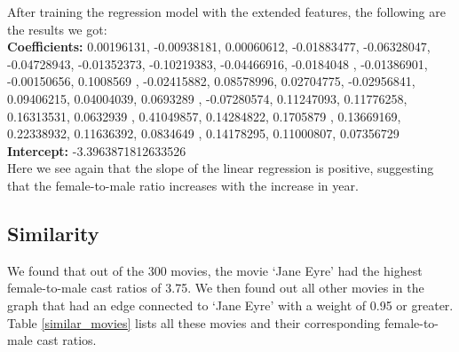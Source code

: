 \documentclass[12pt]{article}
\begin{document}
After training the regression model with the extended features, the following are the results we got: \\

\textbf{Coefficients:} 0.00196131, -0.00938181,  0.00060612, -0.01883477, -0.06328047,
       -0.04728943, -0.01352373, -0.10219383, -0.04466916, -0.0184048 ,
       -0.01386901, -0.00150656,  0.1008569 , -0.02415882,  0.08578996,
        0.02704775, -0.02956841,  0.09406215,  0.04004039,  0.0693289 ,
       -0.07280574,  0.11247093,  0.11776258,  0.16313531,  0.0632939 ,
        0.41049857,  0.14284822,  0.1705879 ,  0.13669169,  0.22338932,
        0.11636392,  0.0834649 ,  0.14178295,  0.11000807,  0.07356729 \\

\textbf{Intercept:} -3.3963871812633526 \\

Here we see again that the slope of the linear regression is positive, suggesting that the female-to-male ratio increases with the increase in year.

\subsection{Similarity}
We found that out of the 300 movies, the movie `Jane Eyre' had the highest female-to-male cast ratios of 3.75. We then found out all other movies in the graph that had an edge connected to `Jane Eyre'  with a weight of 0.95 or greater. Table \ref{similar_movies} lists all these movies and their corresponding female-to-male cast ratios.
\end{document}
